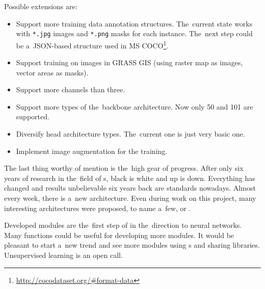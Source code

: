 Possible extensions are:
\begin{itemize}
	\item Support more training data annotation structures. The~current state
	works with \verb|*.jpg| images and \verb|*.png| masks for each instance.
	The~next step could be a~JSON-based structure used in MS
	COCO\footnote{\url{http://cocodataset.org/\#format-data}}.
	\item Support training on images in GRASS GIS (using raster map as images,
	vector areas as masks).
	\item Support more channels than three.
	\item Support more types of the~backbone architecture. Now only  50
	and  101 are supported.
	\item Diversify head architecture types. The~current one is just very basic
	one.
	\item Implement image augmentation for the training.
\end{itemize}

The last thing worthy of mention is the~high gear of progress. After only six 
years of research in the~field of s, black is white and up is down. 
Everything has changed and results unbelievable six years back are standards 
nowadays. Almost every week, there is a~new architecture. Even during work on 
this project, many interesting architectures were proposed, to name a~few, 
\cite{masklab} or \cite{panoptic}.

Developed modules are the~first step of   in the~direction to 
neural networks. Many functions could be useful for developing more modules. It 
would be pleasant to start a~new trend and see more modules using s and 
sharing libraries. Unsupervised learning is an open call.

